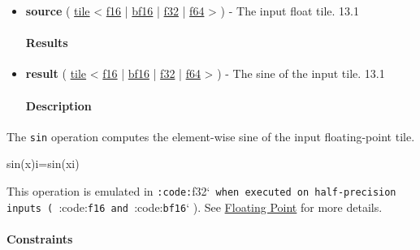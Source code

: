 \documentclass{article}
\begin{document}
\begin{itemize}
\item \textbf{source} ( \href{https://docs.nvidia.com/cuda/tile-ir/latest/sections/types.html#type-tile}{tile} < \href{https://docs.nvidia.com/cuda/tile-ir/latest/sections/types.html#subsection-element-types}{f16} | \href{https://docs.nvidia.com/cuda/tile-ir/latest/sections/types.html#subsection-element-types}{bf16} | \href{https://docs.nvidia.com/cuda/tile-ir/latest/sections/types.html#subsection-element-types}{f32} | \href{https://docs.nvidia.com/cuda/tile-ir/latest/sections/types.html#subsection-element-types}{f64} > ) - The input float tile. 13.1


\paragraph{Results}

\item \textbf{result} ( \href{https://docs.nvidia.com/cuda/tile-ir/latest/sections/types.html#type-tile}{tile} < \href{https://docs.nvidia.com/cuda/tile-ir/latest/sections/types.html#subsection-element-types}{f16} | \href{https://docs.nvidia.com/cuda/tile-ir/latest/sections/types.html#subsection-element-types}{bf16} | \href{https://docs.nvidia.com/cuda/tile-ir/latest/sections/types.html#subsection-element-types}{f32} | \href{https://docs.nvidia.com/cuda/tile-ir/latest/sections/types.html#subsection-element-types}{f64} > ) - The sine of the input tile. 13.1


\paragraph{Description}

\end{itemize}
The \texttt{sin} operation computes the element-wise sine of the input floating-point tile.


sin(x)i=sin(xi)

This operation is emulated in \texttt{:code:}f32`\texttt{ when executed on half-precision inputs ( }:code:\texttt{f16}\texttt{ and }:code:\texttt{bf16}` ). See \href{https://docs.nvidia.com/cuda/tile-ir/latest/sections/operations.html#op-group-floating-point}{Floating Point} for more details.



\paragraph{Constraints}
\end{document}
